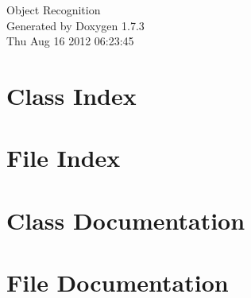 \documentclass[a4paper]{book}
\begin{document}
\hypersetup{pageanchor=false}
\begin{titlepage}
\vspace*{7cm}
\begin{center}
{\Large Object Recognition }\\
\vspace*{1cm}
{\large Generated by Doxygen 1.7.3}\\
\vspace*{0.5cm}
{\small Thu Aug 16 2012 06:23:45}\\
\end{center}
\end{titlepage}
\clearemptydoublepage
{}
\tableofcontents
\clearemptydoublepage
{}
\hypersetup{pageanchor=true}
\chapter{Class Index}

\chapter{File Index}

\chapter{Class Documentation}








\chapter{File Documentation}













\printindex
\end{document}
